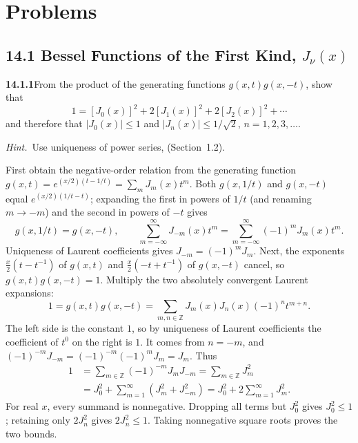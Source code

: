 
\section*{Problems}

\subsection*{14.1 Bessel Functions of the First Kind, $J_{\nu}(x)$}

\par\bigskip
\noindent\textbf{14.1.1}\quad From the product of the generating functions
$g(x,t)g(x,-t)$, show that
\[
1=[J_{0}(x)]^{2}+2[J_{1}(x)]^{2}+2[J_{2}(x)]^{2}+\cdots
\]
and therefore that $|J_{0}(x)|\le1$ and
$|J_{n}(x)|\le1/\sqrt{2}$, $n=1,2,3,\ldots$.
\par\emph{Hint.}~Use uniqueness of power series, (Section~1.2).
\par{}
\solution
{}
First obtain the negative-order relation from the generating function
$g(x,t)=e^{(x/2)(t-1/t)}=\sum_mJ_m(x)t^m$. Both $g(x,1/t)$ and
$g(x,-t)$ equal $e^{(x/2)(1/t-t)}$; expanding the first in powers of
$1/t$ (and renaming $m\to-m$) and the second in powers of $-t$ gives
\[
g(x,1/t)=g(x,-t),\qquad
\sum_{m=-\infty}^{\infty}J_{-m}(x)t^m
=\sum_{m=-\infty}^{\infty}(-1)^mJ_m(x)t^m.
\]
Uniqueness of Laurent coefficients gives $J_{-m}=(-1)^mJ_m$.
Next, the exponents $\frac x2(t-t^{-1})$ of $g(x,t)$ and
$\frac x2(-t+t^{-1})$ of $g(x,-t)$ cancel, so $g(x,t)g(x,-t)=1$.
Multiply the two absolutely convergent Laurent expansions:
\[
1=g(x,t)g(x,-t)
=\sum_{m,n\in\mathbb Z}J_m(x)J_n(x)(-1)^n t^{m+n}.
\]
The left side is the constant $1$, so by uniqueness of Laurent
coefficients the coefficient of $t^0$ on the right is $1$. It comes
from $n=-m$, and $(-1)^{-m}J_{-m}=(-1)^{-m}(-1)^mJ_m=J_m$. Thus
\begin{align*}
1&=\sum_{m\in\mathbb Z}(-1)^{-m}J_mJ_{-m}
=\sum_{m\in\mathbb Z}J_m^2\\
&=J_0^2+\sum_{m=1}^{\infty}(J_m^2+J_{-m}^2)
=\boxed{J_0^2+2\sum_{m=1}^{\infty}J_m^2}.
\end{align*}
For real $x$, every summand is nonnegative. Dropping all terms but
$J_0^2$ gives $J_0^2\le1$; retaining only $2J_n^2$ gives
$2J_n^2\le1$. Taking nonnegative square roots proves the two bounds.

